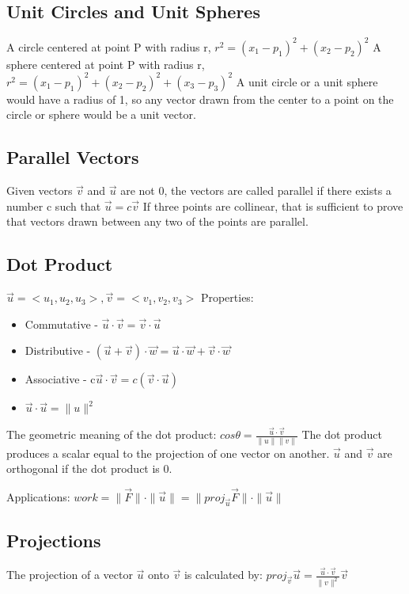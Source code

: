 \documentclass [12 pt, oneside] {book}
\begin{document}
\subsection{Unit Circles and Unit Spheres}
A circle centered at point P with radius r, $r^2=(x_1-p_1)^2+(x_2-p_2)^2$
A sphere centered at point P with radius r, $r^2=(x_1-p_1)^2+(x_2-p_2)^2+(x_3-p_3)^2$
A unit circle or a unit sphere would have a radius of 1, so any vector drawn from the center to a point on the circle or sphere would be a unit vector.

\subsection{Parallel Vectors}
Given vectors $\vec{v}$ and $\vec{u}$ are not 0, the vectors are called parallel if there exists a number c such that $\vec{u}=c\vec{v}$\newline
If three points are collinear, that is sufficient to prove that vectors drawn between any two of the points are parallel. 

\subsection{Dot Product}
$\vec{u} = <u_1,u_2,u_3>, \vec{v} = <v_1,v_2,v_3>$\newline
Properties:
\begin{itemize}
\item Commutative - $\vec{u}\cdot\vec{v}=\vec{v}\cdot\vec{u}$
\item Distributive - $(\vec{u}+\vec{v})\cdot\vec{w}=\vec{u}\cdot\vec{w}+\vec{v}\cdot\vec{w}$
\item Associative - c$\vec{u}\cdot\vec{v}=c(\vec{v}\cdot\vec{u})$
\item $\vec{u}\cdot\vec{u}=\|u\|^2$
\end{itemize}
The geometric meaning of the dot product: $cos\theta = \frac{\vec{u}\cdot\vec{v}}{\|u\|\|v\|}$
The dot product produces a scalar equal to the projection of one vector on another. $\vec{u}$ and $\vec{v}$ are orthogonal if the dot product is 0.

Applications: $work = \|\vec{F}\|\cdot\|\vec{u}\| = \|proj_{\vec{u}}\vec{F}\|\cdot\|\vec{u}\|$

\subsection{Projections}
The projection of a vector $\vec{u}$ onto $\vec{v}$ is calculated by:
$proj_{\vec{v}}\vec{u}=\frac{\vec{u}\cdot\vec{v}}{\|v\|^2}\vec{v}$
\end{document}
